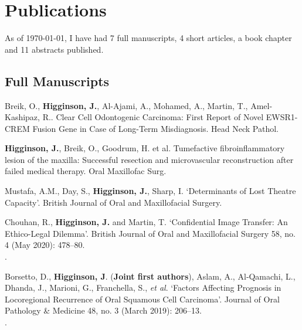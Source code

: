 \section*{Publications}
\label{publications}


As of \today, I have had 7 full manuscripts, 4 short articles, a book chapter and 11 abstracts published.

\subsection*{Full Manuscripts}

 Breik, O., \textbf{Higginson, J.}, Al-Ajami, A., Mohamed, A., Martin, T., Amel-Kashipaz, R.. Clear Cell Odontogenic Carcinoma: First Report of Novel EWSR1-CREM Fusion Gene in Case of Long-Term Misdiagnosis. Head Neck Pathol. 
\\

\textbf{Higginson, J.}, Breik, O., Goodrum, H. et al. Tumefactive fibroinflammatory lesion of the maxilla: Successful resection and microvascular reconstruction after failed medical therapy. Oral Maxillofac Surg. 
\\

\vspace{0.1cm}

 Mustafa, A.M., Day, S., \textbf{Higginson, J.}, Sharp, I. `Determinants of Lost Theatre Capacity'. British Journal of Oral and Maxillofacial Surgery.
\\

\vspace{0.1cm}

 Chouhan, R., \textbf{Higginson, J.} and Martin, T. `Confidential Image Transfer: An Ethico-Legal Dilemma’. British Journal of Oral and Maxillofacial Surgery 58, no. 4 (May 2020): 478–80. 
\\.

\vspace{0.1cm}

 Borsetto, D., \textbf{Higginson, J}. (\textbf{Joint first authors}), Aslam, A., Al‐Qamachi, L., Dhanda, J., Marioni, G., Franchella, S., \textit{et al}. `Factors Affecting Prognosis in Locoregional Recurrence of Oral Squamous Cell Carcinoma’. Journal of Oral Pathology \& Medicine 48, no. 3 (March 2019): 206–13.
\\.

